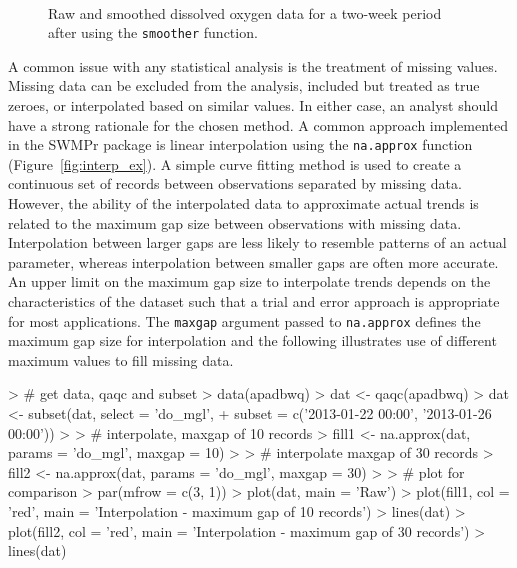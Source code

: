 \begin{figure}[!h]

{\centering \includegraphics[width=0.00\textwidth]{figure/smooth_ex-1} 

}

\caption[Raw and smoothed dissolved oxygen data for a two-week period after using the \texttt{smoother} function]{Raw and smoothed dissolved oxygen data for a two-week period after using the \texttt{smoother} function.}\label{fig:smooth_ex}
\end{figure}

A common issue with any statistical analysis is the treatment of missing values.  Missing data can be excluded from the analysis, included but treated as true zeroes, or interpolated based on similar values.  In either case, an analyst should have a strong rationale for the chosen method.  A common approach implemented in the SWMPr package is linear interpolation using the \texttt{na.approx} function (Figure~\ref{fig:interp_ex}).  A simple curve fitting method is used to create a continuous set of records between observations separated by missing data.  However, the ability of the interpolated data to approximate actual trends is related to the maximum gap size between observations with missing data.  Interpolation between larger gaps are less likely to resemble patterns of an actual parameter, whereas interpolation between smaller gaps are often more accurate.  An upper limit on the maximum gap size to interpolate trends depends on the characteristics of the dataset such that a trial and error approach is appropriate for most applications.  The \texttt{maxgap} argument passed to \texttt{na.approx} defines the maximum gap size for interpolation and the following illustrates use of different maximum values to fill missing data.  

\begin{example}
> # get data, qaqc and subset
> data(apadbwq)
> dat <- qaqc(apadbwq)
> dat <- subset(dat, select = 'do_mgl', 
+   subset = c('2013-01-22 00:00', '2013-01-26 00:00'))
> 
> # interpolate, maxgap of 10 records
> fill1 <- na.approx(dat, params = 'do_mgl', maxgap = 10)
> 
> # interpolate maxgap of 30 records
> fill2 <- na.approx(dat, params = 'do_mgl', maxgap = 30)
> 
> # plot for comparison
> par(mfrow = c(3, 1))
> plot(dat, main = 'Raw')
> plot(fill1, col = 'red', main = 'Interpolation - maximum gap of 10 records')
> lines(dat)
> plot(fill2, col = 'red', main = 'Interpolation - maximum gap of 30 records')
> lines(dat)
\end{example}

